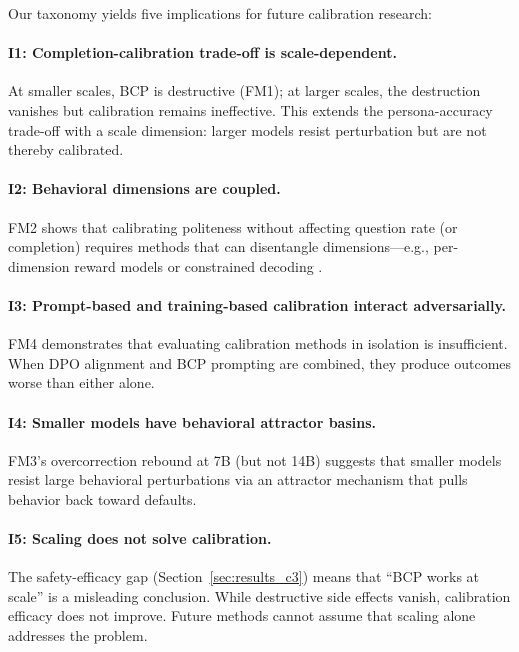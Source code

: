 \documentclass[11pt,a4paper]{article}
\newcommand{\fm}[1]{\textsc{FM#1}}
\newcommand{\bcp}{\textsc{BCP}}
\begin{document}
Our taxonomy yields five implications for future calibration research:

\paragraph{I1: Completion-calibration trade-off is scale-dependent.}
At smaller scales, \bcp{} is destructive (\fm{1}); at larger scales, the destruction vanishes but calibration remains ineffective.
This extends the persona-accuracy trade-off \cite{basil2025playing_pretend,hu2026expert_persona} with a scale dimension: larger models resist perturbation but are not thereby calibrated.

\paragraph{I2: Behavioral dimensions are coupled.}
\fm{2} shows that calibrating politeness without affecting question rate (or completion) requires methods that can disentangle dimensions---e.g., per-dimension reward models or constrained decoding \cite{khan2026decoding}.

\paragraph{I3: Prompt-based and training-based calibration interact adversarially.}
\fm{4} demonstrates that evaluating calibration methods in isolation is insufficient.
When DPO alignment and \bcp{} prompting are combined, they produce outcomes worse than either alone.

\paragraph{I4: Smaller models have behavioral attractor basins.}
\fm{3}'s overcorrection rebound at 7B (but not 14B) suggests that smaller models resist large behavioral perturbations via an attractor mechanism that pulls behavior back toward defaults.

\paragraph{I5: Scaling does not solve calibration.}
The safety-efficacy gap (Section~\ref{sec:results_c3}) means that ``\bcp{} works at scale'' is a misleading conclusion.
While destructive side effects vanish, calibration efficacy does not improve.
Future methods cannot assume that scaling alone addresses the problem.
\end{document}
